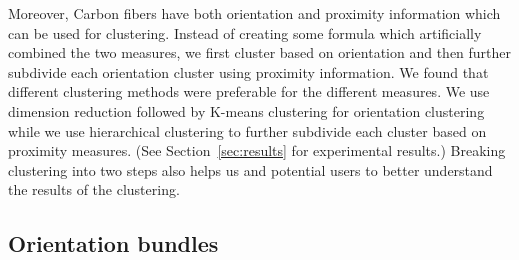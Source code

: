 Moreover, Carbon fibers have both orientation and proximity information which can be used for clustering. Instead of creating some formula
which artificially combined the two measures,  we first cluster based on orientation and then further subdivide each orientation cluster using proximity information. We found that different clustering methods were preferable
for the different measures. We use dimension reduction followed by K-means clustering
for orientation clustering while we use hierarchical clustering to further subdivide each cluster
based on proximity measures. (See Section~\ref{sec:results} for experimental results.) Breaking clustering into two steps also helps us and potential users
to better understand the results of the clustering.








\subsection {Orientation bundles}


